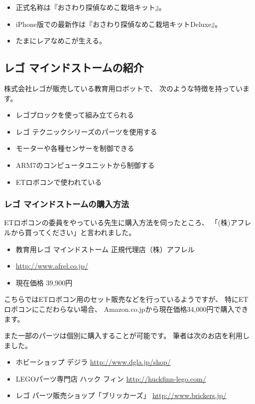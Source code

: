 \documentclass[mingoth,a4paper]{jsarticle}
\begin{document}
\begin{itemize}
\item 正式名称は『おさわり探偵なめこ栽培キット』。
\item iPhone版での最新作は『おさわり探偵なめこ栽培キットDeluxe』。
\item たまにレアなめこが生える。
\end{itemize}

\subsection{レゴ マインドストームの紹介}

株式会社レゴが販売している教育用ロボットで、
次のような特徴を持っています。

\begin{itemize}
\item レゴブロックを使って組み立てられる
\item レゴ テクニックシリーズのパーツを使用する
\item モーターや各種センサーを制御できる
\item ARM7のコンピュータユニットから制御する
\item ETロボコンで使われている
\end{itemize}

\subsubsection{レゴ マインドストームの購入方法}
ETロボコンの委員をやっている先生に購入方法を伺ったところ、
「(株)アフレルから買ってください」と言われました。

\begin{itemize}
\item 教育用レゴ マインドストーム 正規代理店（株）アフレル
\item \url{http://www.afrel.co.jp/}
\item 現在価格 39,900円
\end{itemize}

こちらではETロボコン用のセット販売などを行っているようですが、
特にETロボコンにこだわらない場合、
Amazon.co.jpから現在価格34,000円で購入できます。

また一部のパーツは個別に購入することが可能です。
筆者は次のお店を利用しました。

\begin{itemize}
\item ホビーショップ デジラ \url{http://www.dgla.jp/shop/}
\item LEGOパーツ専門店 ハック フィン \url{http://huckfinn-lego.com/}
\item レゴ パーツ販売ショップ「ブリッカーズ」 \url{http://www.brickers.jp/}
\end{itemize}
\end{document}

